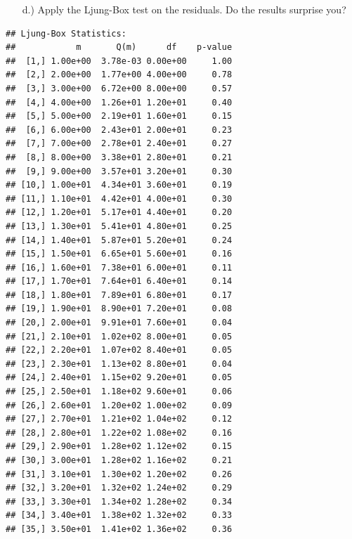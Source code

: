 \documentclass[12pt,a4paper]{article}
\newenvironment{Shaded}{\begin{snugshade}}{\end{snugshade}}
\newcommand{\DataTypeTok}[1]{\textcolor[rgb]{0.13,0.29,0.53}{#1}}
\newcommand{\DecValTok}[1]{\textcolor[rgb]{0.00,0.00,0.81}{#1}}
\newcommand{\KeywordTok}[1]{\textcolor[rgb]{0.13,0.29,0.53}{\textbf{#1}}}
\newcommand{\NormalTok}[1]{#1}
\newcommand{\OperatorTok}[1]{\textcolor[rgb]{0.81,0.36,0.00}{\textbf{#1}}}
\newcommand{\StringTok}[1]{\textcolor[rgb]{0.31,0.60,0.02}{#1}}
\begin{document}
\begin{itemize}
  \item[d.)] Apply the Ljung-Box test on the residuals. Do the results surprise you? 
\end{itemize}

\begin{Shaded}
\end{Shaded}

\begin{verbatim}
## Ljung-Box Statistics:  
##            m       Q(m)      df    p-value
##  [1,] 1.00e+00  3.78e-03 0.00e+00     1.00
##  [2,] 2.00e+00  1.77e+00 4.00e+00     0.78
##  [3,] 3.00e+00  6.72e+00 8.00e+00     0.57
##  [4,] 4.00e+00  1.26e+01 1.20e+01     0.40
##  [5,] 5.00e+00  2.19e+01 1.60e+01     0.15
##  [6,] 6.00e+00  2.43e+01 2.00e+01     0.23
##  [7,] 7.00e+00  2.78e+01 2.40e+01     0.27
##  [8,] 8.00e+00  3.38e+01 2.80e+01     0.21
##  [9,] 9.00e+00  3.57e+01 3.20e+01     0.30
## [10,] 1.00e+01  4.34e+01 3.60e+01     0.19
## [11,] 1.10e+01  4.42e+01 4.00e+01     0.30
## [12,] 1.20e+01  5.17e+01 4.40e+01     0.20
## [13,] 1.30e+01  5.41e+01 4.80e+01     0.25
## [14,] 1.40e+01  5.87e+01 5.20e+01     0.24
## [15,] 1.50e+01  6.65e+01 5.60e+01     0.16
## [16,] 1.60e+01  7.38e+01 6.00e+01     0.11
## [17,] 1.70e+01  7.64e+01 6.40e+01     0.14
## [18,] 1.80e+01  7.89e+01 6.80e+01     0.17
## [19,] 1.90e+01  8.90e+01 7.20e+01     0.08
## [20,] 2.00e+01  9.91e+01 7.60e+01     0.04
## [21,] 2.10e+01  1.02e+02 8.00e+01     0.05
## [22,] 2.20e+01  1.07e+02 8.40e+01     0.05
## [23,] 2.30e+01  1.13e+02 8.80e+01     0.04
## [24,] 2.40e+01  1.15e+02 9.20e+01     0.05
## [25,] 2.50e+01  1.18e+02 9.60e+01     0.06
## [26,] 2.60e+01  1.20e+02 1.00e+02     0.09
## [27,] 2.70e+01  1.21e+02 1.04e+02     0.12
## [28,] 2.80e+01  1.22e+02 1.08e+02     0.16
## [29,] 2.90e+01  1.28e+02 1.12e+02     0.15
## [30,] 3.00e+01  1.28e+02 1.16e+02     0.21
## [31,] 3.10e+01  1.30e+02 1.20e+02     0.26
## [32,] 3.20e+01  1.32e+02 1.24e+02     0.29
## [33,] 3.30e+01  1.34e+02 1.28e+02     0.34
## [34,] 3.40e+01  1.38e+02 1.32e+02     0.33
## [35,] 3.50e+01  1.41e+02 1.36e+02     0.36
\end{verbatim}
\end{document}
